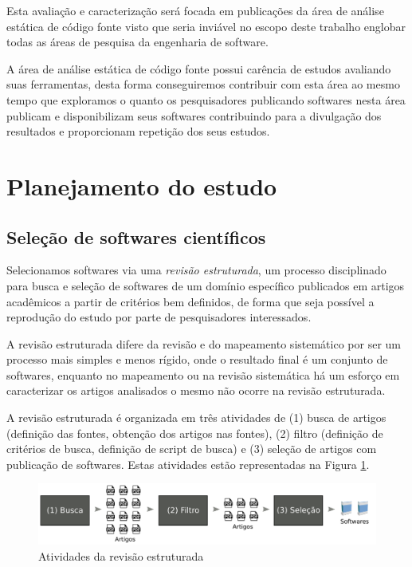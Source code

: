 Esta avaliação e caracterização será focada em publicações da área de análise
estática de código fonte visto que seria inviável no escopo deste trabalho
englobar todas as áreas de pesquisa da engenharia de software.

A área de análise estática de código fonte possui carência de estudos avaliando
suas ferramentas, desta forma conseguiremos contribuir com esta área ao mesmo
tempo que exploramos o quanto os pesquisadores publicando softwares nesta área
publicam e disponibilizam seus softwares contribuindo para a divulgação dos
resultados e proporcionam repetição dos seus estudos.

\section{Planejamento do estudo}

\subsection{Seleção de softwares científicos}

Selecionamos softwares via uma {\it
revisão estruturada}, um processo disciplinado para busca e seleção de
softwares de um domínio específico publicados em artigos acadêmicos a partir de
critérios bem definidos, de forma que seja possível a reprodução do estudo por
parte de pesquisadores interessados.

A revisão estruturada difere da revisão \cite{Kitchenham2007} e do mapeamento sistemático por ser um
processo mais simples e menos rígido, onde o resultado final é um conjunto de
softwares, enquanto no mapeamento ou na revisão sistemática há um esforço em
caracterizar os artigos analisados o mesmo não ocorre na revisão estruturada.

A revisão estruturada é organizada em três atividades de (1) busca de artigos
(definição das fontes, obtenção dos artigos nas fontes), (2) filtro (definição
de critérios de busca, definição de script de busca) e (3) seleção de artigos
com publicação de softwares. Estas atividades estão representadas na Figura
\ref{figura-revisao-estruturada}.

\begin{figure}[h]
  \center
  \includegraphics[scale=0.21]{imagens/revisao-estruturada.png}
  \caption{Atividades da revisão estruturada}
  \label{figura-revisao-estruturada}
\end{figure}


